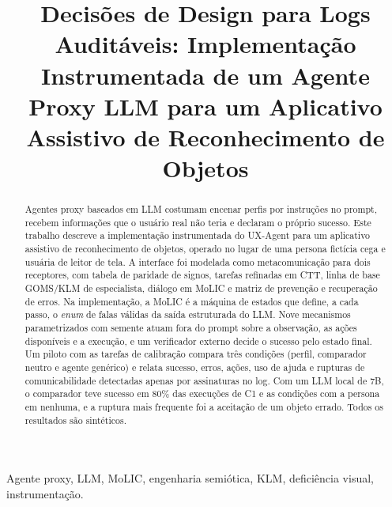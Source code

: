 \documentclass[conference]{IEEEtran}
\begin{document}
\title{Decisões de Design para Logs Auditáveis: Implementação Instrumentada de um Agente Proxy LLM para um Aplicativo Assistivo de Reconhecimento de Objetos}

\author{
}

\maketitle

\begin{abstract}
Agentes proxy baseados em LLM costumam encenar perfis por instruções no prompt, recebem informações que o usuário real não teria e declaram o próprio sucesso. Este trabalho descreve a implementação instrumentada do UX-Agent para um aplicativo assistivo de reconhecimento de objetos, operado no lugar de uma persona fictícia cega e usuária de leitor de tela. A interface foi modelada como metacomunicação para dois receptores, com tabela de paridade de signos, tarefas refinadas em CTT, linha de base GOMS/KLM de especialista, diálogo em MoLIC e matriz de prevenção e recuperação de erros. Na implementação, a MoLIC é a máquina de estados que define, a cada passo, o \emph{enum} de falas válidas da saída estruturada do LLM. Nove mecanismos parametrizados com semente atuam fora do prompt sobre a observação, as ações disponíveis e a execução, e um verificador externo decide o sucesso pelo estado final. Um piloto com as tarefas de calibração compara três condições (perfil, comparador neutro e agente genérico) e relata sucesso, erros, ações, uso de ajuda e rupturas de comunicabilidade detectadas apenas por assinaturas no log. Com um LLM local de 7B, o comparador teve sucesso em 80\% das execuções de C1 e as condições com a persona em nenhuma, e a ruptura mais frequente foi a aceitação de um objeto errado. Todos os resultados são sintéticos.
\end{abstract}

\begin{IEEEkeywords}
Agente proxy, LLM, MoLIC, engenharia semiótica, KLM, deficiência visual, instrumentação.
\end{IEEEkeywords}
\end{document}
